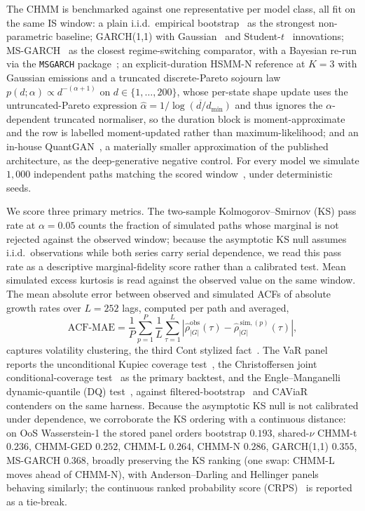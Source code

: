 The CHMM is benchmarked against one representative per model class, all fit on the same IS window: a plain i.i.d.\ empirical bootstrap~\cite{efron1979bootstrap} as the strongest non-parametric baseline; GARCH(1,1) with Gaussian~\cite{bollerslev1986generalized} and Student-$t$~\cite{bollerslev1987conditionally} innovations; MS-GARCH~\cite{haas2004new} as the closest regime-switching comparator, with a Bayesian re-run via the \texttt{MSGARCH} package~\cite{ardia2019msgarch}; an explicit-duration HSMM-N reference at $K = 3$ with Gaussian emissions and a truncated discrete-Pareto sojourn law $p(d;\alpha) \propto d^{-(\alpha+1)}$ on $d \in \{1, \ldots, 200\}$, whose per-state shape update uses the untruncated-Pareto expression $\hat\alpha = 1/\overline{\log(d/d_{\min})}$ and thus ignores the $\alpha$-dependent truncated normaliser, so the duration block is moment-approximate and the row is labelled moment-updated rather than maximum-likelihood; and an in-house QuantGAN~\cite{wiese2020quantgan}, a materially smaller approximation of the published architecture, as the deep-generative negative control. For every model we simulate $1{,}000$ independent paths matching the scored window~\cite{stenger2024thinking}, under deterministic seeds.

We score three primary metrics. The two-sample Kolmogorov--Smirnov (KS) pass rate at $\alpha = 0.05$ counts the fraction of simulated paths whose marginal is not rejected against the observed window; because the asymptotic KS null assumes i.i.d.\ observations while both series carry serial dependence, we read this pass rate as a descriptive marginal-fidelity score rather than a calibrated test. Mean simulated excess kurtosis is read against the observed value on the same window. The mean absolute error between observed and simulated ACFs of absolute growth rates over $L = 252$ lags, computed per path and averaged,
\begin{equation}
    \text{ACF-MAE} = \frac{1}{P}\sum_{p=1}^{P}\frac{1}{L}\sum_{\tau=1}^{L} \left| \hat\rho^{\text{obs}}_{|G|}(\tau) - \hat\rho^{\,\text{sim},(p)}_{|G|}(\tau) \right|,
    \label{eq:acf_mae}
\end{equation}
captures volatility clustering, the third Cont stylized fact~\cite{cont2001empirical}. The VaR panel reports the unconditional Kupiec coverage test~\cite{kupiec1995techniques}, the Christoffersen joint conditional-coverage test~\cite{christoffersen1998evaluating} as the primary backtest, and the Engle--Manganelli dynamic-quantile (DQ) test~\cite{engle2004caviar}, against filtered-bootstrap~\cite{barone1999var} and CAViaR~\cite{engle2004caviar} contenders on the same harness. Because the asymptotic KS null is not calibrated under dependence, we corroborate the KS ordering with a continuous distance: on OoS Wasserstein-1 the stored panel orders bootstrap $0.193$, shared-$\nu$ CHMM-t $0.236$, CHMM-GED $0.252$, CHMM-L $0.264$, CHMM-N $0.286$, GARCH(1,1) $0.355$, MS-GARCH $0.368$, broadly preserving the KS ranking (one swap: CHMM-L moves ahead of CHMM-N), with Anderson--Darling and Hellinger panels behaving similarly; the continuous ranked probability score (CRPS)~\cite{gneiting2007strictly} is reported as a tie-break.
